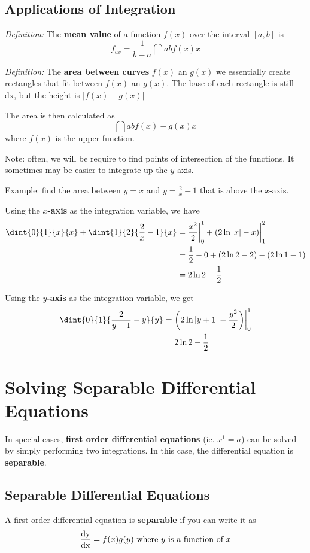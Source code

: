 \documentclass[12pt]{article}
\begin{document}
\subsection*{Applications of Integration}
\textit{Definition:} The {\bf mean value} of a function $f(x)$ over the interval $[a,b]$ is \[ f_{av} = \frac{1}{b-a}\dint{a}{b}{f(x)}{x} \]

\textit{Definition:} The {\bf area between curves} $f(x)$ an $g(x)$ we essentially create rectangles that fit between $f(x)$ an $g(x)$. The base of each rectangle is still dx, but the height is $|f(x) - g(x)|$

The area is then calculated as \[ \dint{a}{b}{f(x)-g(x)}{x} \] where $f(x)$ is the upper function.

Note: often, we will be require to find points of intersection of the functions. It sometimes may be easier to integrate up the $y$-axis.

Example: find the area between $y = x$ and $y = \frac{2}{x} - 1$ that is above the $x$-axis.

Using the {\bf $x$-axis} as the integration variable, we have
\begin{align*}
\dint{0}{1}{x}{x} + \dint{1}{2}{\frac{2}{x} - 1}{x} &= \frac{x^2}{2}\bigg|_0^1 + (2\ln|x| - x)\bigg|_1^2\\
&= \half - 0 + (2\ln 2 - 2) - (2\ln 1 - 1)\\
&= 2\ln 2 - \half
\end{align*}

Using the {\bf $y$-axis} as the integration variable, we get
\begin{align*}
\dint{0}{1}{\frac{2}{y+1} - y}{y} &= \bigg(2\ln|y+1| - \frac{y^2}{2}\bigg)\bigg|_0^1\\
&= 2\ln 2 - \half
\end{align*}

\section*{Solving Separable Differential Equations}
In special cases, {\bf first order differential equations} (ie. $x^1 = a$) can be solved by simply performing two integrations. In this case, the differential equation is {\bf separable}.

\subsection*{Separable Differential Equations}
A first order differential equation is {\bf separable} if you can write it as \[ \frac{{\rm dy}}{{\rm dx}} = f(x)g(y) \text{ where $y$ is a function of $x$} \]
\end{document}
